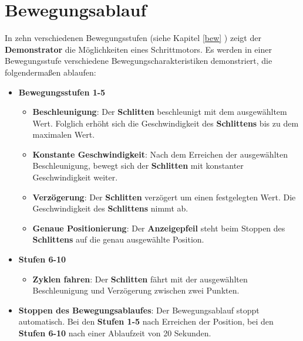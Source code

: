 
\chapter{Bewegungsablauf}

In zehn verschiedenen Bewegungsstufen (siehe Kapitel \ref{bew} ) zeigt der \textbf{Demonstrator} die Möglichkeiten eines Schrittmotors. Es werden in einer Bewegungsstufe verschiedene Bewegungscharakteristiken demonstriert, die folgendermaßen ablaufen:  

\begin{itemize}
	\item \textbf{Bewegungsstufen 1-5}
	\begin{itemize}
		\item\textbf{Beschleunigung}: Der \textbf{Schlitten} beschleunigt mit dem ausgewähltem Wert. Folglich erhöht sich die Geschwindigkeit des \textbf{Schlittens} bis zu dem maximalen Wert. 
		\item\textbf{Konstante Geschwindigkeit}: Nach dem Erreichen der ausgewählten Beschleunigung, bewegt sich der \textbf{Schlitten} mit konstanter Geschwindigkeit weiter.
		\item\textbf{Verzögerung}: Der \textbf{Schlitten} verzögert um einen festgelegten Wert. Die Geschwindigkeit des \textbf{Schlittens} nimmt ab.
		\item\textbf{Genaue Positionierung}: Der \textbf{Anzeigepfeil} steht beim Stoppen des \textbf{Schlittens} auf die genau ausgewählte Position.
	\end{itemize}
\end{itemize}
\begin{itemize}	
	\item \textbf{Stufen 6-10}
	\begin{itemize}
		\item\textbf{Zyklen fahren}: Der \textbf{Schlitten} fährt mit der ausgewählten Beschleunigung und Verzögerung zwischen zwei Punkten.
	\end{itemize}			
\item \textbf{Stoppen des Bewegungsablaufes}: Der Bewegungsablauf stoppt automatisch. Bei den \textbf{Stufen 1-5} nach Erreichen der Position, bei den \textbf{ Stufen 6-10} nach einer Ablaufzeit von 20 Sekunden.
\end{itemize}
